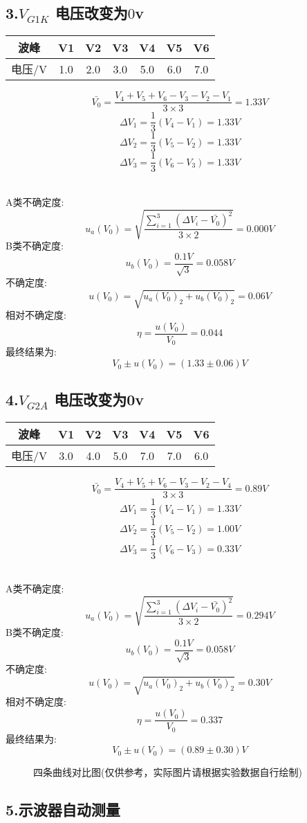 \documentclass[11pt,a4paper,oneside]{article}
\begin{document}
\subsection*{3.$V_{G1K}$ 电压改变为$0$v}
\begin{center}
\begin{tabular}{|c|c|c|c|c|c|c|}
	\hline
	波峰&V1&V2&V3&V4&V5&V6
	\\\hline
	电压/V&1.0&2.0&3.0&5.0&6.0&7.0\\\hline
	\end{tabular}
	\end{center}

$$  \bar{V_0}=\frac{V_4+V_5+V_6-V_3-V_2-V_1}{3\times 3}=1.33V $$
$$	\Delta V_1=\frac{1}{3}(V_4-V_1)=1.33V $$
$$	\Delta V_2=\frac{1}{3}(V_5-V_2)=1.33V $$
$$	\Delta V_3=\frac{1}{3}(V_6-V_3)=1.33V $$ 

\ \\
A类不确定度:
$$	u_a(V_0)=\sqrt{\frac{\sum\limits_{i=1}^{3} (\Delta V_i-\bar{V_0})^2}{3\times 2}}=0.000V $$
B类不确定度:
$$	u_b(V_0)=\frac{0.1V}{\sqrt{3}}=0.058V $$
不确定度:
$$	u(V_0)=\sqrt{u_a(V_0)_2+u_b(V_0)_2}=0.06V $$
相对不确定度:
$$	\eta=\frac{u(V_0)}{V_0}=0.044 $$
最终结果为:
$$	V_0 \pm u(V_0) = (1.33 \pm 0.06)V $$


\subsection*{4.$V_{G2A}$ 电压改变为0v}
\begin{center}
\begin{tabular}{|c|c|c|c|c|c|c|}
	\hline
	波峰&V1&V2&V3&V4&V5&V6
	\\\hline
	电压/V&3.0&4.0&5.0&7.0&7.0&6.0\\\hline
	\end{tabular}
	\end{center}

$$  \bar{V_0}=\frac{V_4+V_5+V_6-V_3-V_2-V_4}{3\times 3}=0.89V $$
$$	\Delta V_1=\frac{1}{3}(V_4-V_1)=1.33V $$
$$	\Delta V_2=\frac{1}{3}(V_5-V_2)=1.00V $$
$$	\Delta V_3=\frac{1}{3}(V_6-V_3)=0.33V $$ 

\ \\
A类不确定度:
$$	u_a(V_0)=\sqrt{\frac{\sum\limits_{i=1}^{3} (\Delta V_i-\bar{V_0})^2}{3\times 2}}=0.294V $$
B类不确定度:
$$	u_b(V_0)=\frac{0.1V}{\sqrt{3}}=0.058V $$
不确定度:
$$	u(V_0)=\sqrt{u_a(V_0)_2+u_b(V_0)_2}=0.30V $$
相对不确定度:
$$	\eta=\frac{u(V_0)}{V_0}=0.337 $$
最终结果为:
$$	V_0 \pm u(V_0) = (0.89 \pm 0.30)V $$


\begin{figure}[H]
	\centering
    \caption{四条曲线对比图(仅供参考，实际图片请根据实验数据自行绘制)}
	\end{figure}

\subsection*{5.示波器自动测量}

\begin{figure}[H]
	\centering
	\end{figure}
\end{document}
